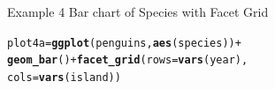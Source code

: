 \documentclass{beamer}\usepackage[]{graphicx}\usepackage[]{xcolor}
\makeatletter
\newcommand{\hlopt}[1]{\textcolor[rgb]{0,0,0}{#1}}%
\newcommand{\hlstd}[1]{\textcolor[rgb]{0.345,0.345,0.345}{#1}}%
\newcommand{\hlkwb}[1]{\textcolor[rgb]{0.69,0.353,0.396}{#1}}%
\newcommand{\hlkwc}[1]{\textcolor[rgb]{0.333,0.667,0.333}{#1}}%
\newcommand{\hlkwd}[1]{\textcolor[rgb]{0.737,0.353,0.396}{\textbf{#1}}}%
\newenvironment{kframe}{%
 \def\at@end@of@kframe{}%
 \ifinner\ifhmode%
  \def\at@end@of@kframe{\end{minipage}}%
  \begin{minipage}{\columnwidth}%
 \fi\fi%
 \def\FrameCommand##1{\hskip\@totalleftmargin \hskip-\fboxsep
 \colorbox{shadecolor}{##1}\hskip-\fboxsep
     \hskip-\linewidth \hskip-\@totalleftmargin \hskip\columnwidth}%
 \MakeFramed {\advance\hsize-\width
   \@totalleftmargin\z@ \linewidth\hsize
   \@setminipage}}%
 {\par\unskip\endMakeFramed%
 \at@end@of@kframe}
\newenvironment{knitrout}{}{} %
\makeatother
\begin{document}
\begin{frame}[fragile]{Example 4 Bar chart of Species with Facet Grid}
\begin{knitrout}
\color{fgcolor}\begin{kframe}
\begin{alltt}
\hlstd{plot4a} \hlkwb{=} \hlkwd{ggplot}\hlstd{(penguins,} \hlkwd{aes}\hlstd{(species))} \hlopt{+}
    \hlkwd{geom_bar}\hlstd{()} \hlopt{+} \hlkwd{facet_grid}\hlstd{(}\hlkwc{rows} \hlstd{=} \hlkwd{vars}\hlstd{(year),}
    \hlkwc{cols} \hlstd{=} \hlkwd{vars}\hlstd{(island))}
\end{alltt}
\end{kframe}
\end{knitrout}
\end{frame}
\end{document}
